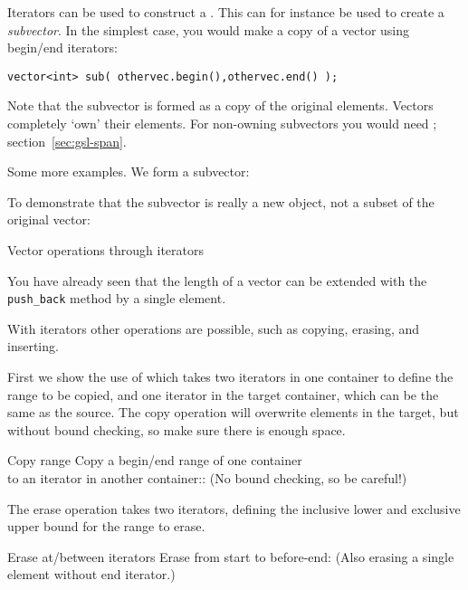 Iterators can be used to construct a . This can
for instance be used to create a
\emph{subvector}.
In the simplest case, you would make a copy
of a vector using begin/end iterators:
\begin{lstlisting}
vector<int> sub( othervec.begin(),othervec.end() );
\end{lstlisting}

Note that the subvector is formed as a copy of the original elements.
Vectors completely `own' their elements. For non-owning subvectors
you would need ; section~\ref{sec:gsl-span}.

Some more examples. We form a subvector:
%

To demonstrate that the subvector is really a new object,
not a subset of the original vector:

 {Vector operations through iterators}

You have already seen that the length of a vector can be
extended with the \lstinline+push_back+ method
by a single element.

With iterators other operations are possible,
such as copying, erasing, and inserting.

First we show the use of  which takes
two iterators in one container to define the range to be copied,
and one iterator in the target container, which can be the same as the source.
The copy operation will overwrite elements in the target,
but without bound checking, so make sure there is enough space.

\begin{block}{Copy range}
  \label{sl:iter-copy}
  Copy a begin/end range of one container\\
  to an iterator in another container::
  (No bound checking, so be careful!)
\end{block}

The erase operation  takes two iterators,
defining the inclusive lower and exclusive upper bound
for the range to erase.

\begin{block}{Erase at/between iterators}
  \label{sl:iter-erase}
  Erase from start to before-end:
  (Also erasing a single element without end iterator.)
\end{block}


